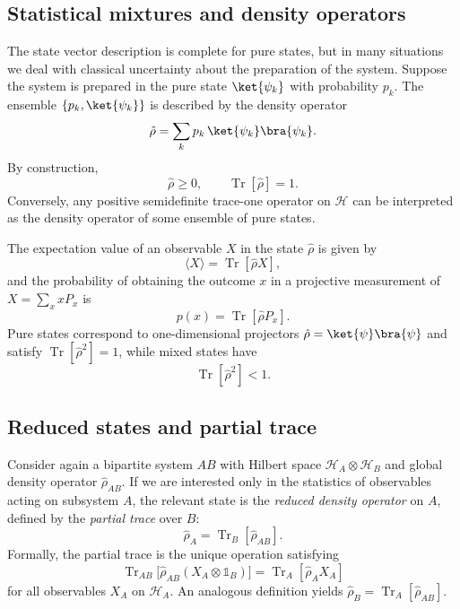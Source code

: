 \subsection{Statistical mixtures and density operators}

The state vector description is complete for pure states, but in many situations we deal with classical uncertainty about the preparation of the system. 
Suppose the system is prepared in the pure state $\ket{\psi_k}$ with probability $p_k$. 
The ensemble $\{p_k, \ket{\psi_k}\}$ is described by the density operator
\begin{equation}
	\hat{\rho} = \sum_k p_k \, \ket{\psi_k}\bra{\psi_k}.
\end{equation}
By construction,
\begin{equation}
	\hat{\rho} \ge 0,
	\qquad
	\operatorname{Tr}[\hat{\rho}] = 1.
\end{equation}
Conversely, any positive semidefinite trace-one operator on $\mathcal{H}$ can be interpreted as the density operator of some ensemble of pure states.

The expectation value of an observable $X$ in the state $\hat{\rho}$ is given by
\begin{equation}
	\langle X \rangle = \operatorname{Tr}[\hat{\rho} X],
\end{equation}
and the probability of obtaining the outcome $x$ in a projective measurement of $X = \sum_x x P_x$ is
\begin{equation}
	p(x) = \operatorname{Tr}[\hat{\rho} P_x].
\end{equation}
Pure states correspond to one-dimensional projectors $\hat{\rho} = \ket{\psi}\bra{\psi}$ and satisfy $\operatorname{Tr}[\hat{\rho}^2] = 1$, while mixed states have
\begin{equation}
	\operatorname{Tr}[\hat{\rho}^2] < 1.
\end{equation}

\subsection{Reduced states and partial trace}

Consider again a bipartite system $AB$ with Hilbert space $\mathcal{H}_A \otimes \mathcal{H}_B$ and global density operator $\hat{\rho}_{AB}$. 
If we are interested only in the statistics of observables acting on subsystem $A$, the relevant state is the \emph{reduced density operator} on $A$, defined by the \emph{partial trace} over $B$:
\begin{equation}
	\hat{\rho}_A = \operatorname{Tr}_B[\hat{\rho}_{AB}].
\end{equation}
Formally, the partial trace is the unique operation satisfying
\begin{equation}
	\operatorname{Tr}_{AB}\bigl[\hat{\rho}_{AB}(X_A \otimes \mathbb{1}_B)\bigr]
	=
	\operatorname{Tr}_A[\hat{\rho}_A X_A]
\end{equation}
for all observables $X_A$ on $\mathcal{H}_A$. 
An analogous definition yields $\hat{\rho}_B = \operatorname{Tr}_A[\hat{\rho}_{AB}]$.

